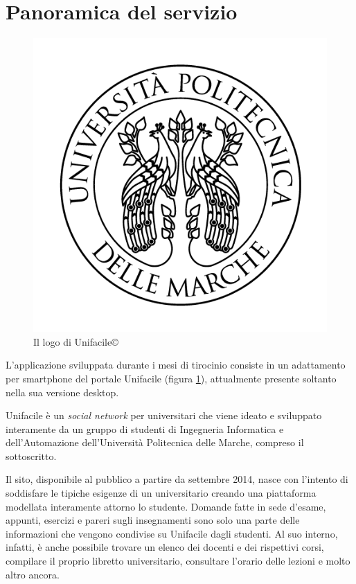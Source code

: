 \section{Panoramica del servizio}\label{sec:panoramica_servizio}
	\begin{figure}[H]
		\centering
		\includegraphics[keepaspectratio=true,scale=0.4]{img/logo-univpm.png}
		\caption{Il logo di Unifacile\copyright}
		\label{fig:logo_univpm}
	\end{figure}

	L’applicazione sviluppata durante i mesi di tirocinio consiste in un adattamento per smartphone del portale Unifacile (figura \ref{fig:logo_univpm}), attualmente presente soltanto nella sua versione desktop.

	Unifacile è un \emph{social network} per universitari che viene ideato e sviluppato interamente da un gruppo di studenti di Ingegneria Informatica e dell’Automazione dell’Università Politecnica delle Marche, compreso il sottoscritto.

	Il sito, disponibile al pubblico a partire da settembre 2014, nasce con l’intento di soddisfare le tipiche esigenze di un universitario creando una piattaforma modellata interamente attorno lo studente. Domande fatte in sede d’esame, appunti, esercizi e pareri sugli insegnamenti sono solo una parte delle informazioni che vengono condivise su Unifacile dagli studenti. Al suo interno, infatti, è anche possibile trovare un elenco dei docenti e dei rispettivi corsi, compilare il proprio libretto universitario, consultare l’orario delle lezioni e molto altro ancora.

